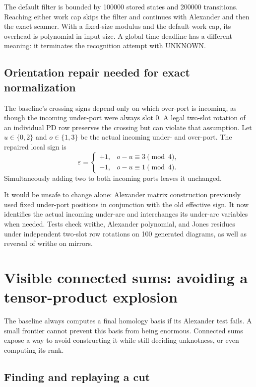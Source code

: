 \documentclass[11pt]{article}
\theoremstyle{definition}\newtheorem{definition}[theorem]{Definition}
\theoremstyle{remark}\newtheorem{remark}[theorem]{Remark}
\newcommand{\code}[1]{\texttt{\detokenize{#1}}}
\newcommand{\UNKNOWN}{\textsf{UNKNOWN}}
\begin{document}
The default filter is bounded by 100000 stored states and 200000 transitions.
Reaching either work cap skips the filter and continues with Alexander and
then the exact scanner. With a fixed-size modulus and the default work cap,
its overhead is polynomial in input size. A global time deadline has a
different meaning: it terminates the recognition attempt with \UNKNOWN.

\subsection{Orientation repair needed for exact normalization}

The baseline's crossing signs depend only on which over-port is incoming,
as though the incoming under-port were always slot 0. A legal two-slot
rotation of an individual PD row preserves the crossing but can violate that
assumption. Let $u\in\{0,2\}$ and $o\in\{1,3\}$ be the actual incoming
under- and over-port. The repaired local sign is
\[
 \varepsilon=\begin{cases}+1,&o-u\equiv3\pmod4,\\-1,&o-u\equiv1\pmod4.
 \end{cases}
\]
Simultaneously adding two to both incoming ports leaves it unchanged.

It would be unsafe to change \code{signs()} alone: Alexander matrix
construction previously used fixed under-port positions in conjunction with
the old effective sign. It now identifies the actual incoming under-arc and
interchanges its under-arc variables when needed. Tests check writhe,
Alexander polynomial, and Jones residues under independent two-slot row
rotations on 100 generated diagrams, as well as reversal of writhe on mirrors.

\section{Visible connected sums: avoiding a tensor-product explosion}
\label{sec:factors}

The baseline always computes a final homology basis if its Alexander test
fails. A small frontier cannot prevent this basis from being enormous.
Connected sums expose a way to avoid constructing it while still deciding
unknotness, or even computing its rank.

\subsection{Finding and replaying a cut}
\end{document}
